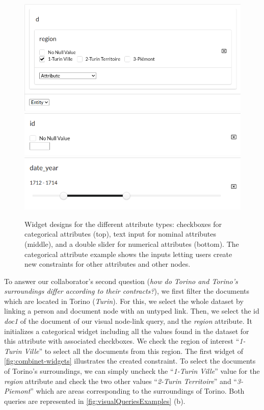 \begin{figure}[!ht]
    \centering
    \includegraphics[width=0.7\linewidth]{static/figures/ComBiNet/OriginalPaperFigures/constraintRegion.png}\\
    \includegraphics[width=0.6\linewidth]{static/figures/ComBiNet/OriginalPaperFigures/nominalWidget}\\
    \includegraphics[width=0.6\linewidth]{static/figures/ComBiNet/OriginalPaperFigures/numericWidget}

    \caption{Widget designs for the different attribute types: checkboxes for categorical attributes (top), text input for nominal attributes (middle), and a double slider for numerical attributes (bottom). The categorical attribute example shows the  inputs letting users create new constraints for other attributes and other nodes.}\label{fig:combinet-widgets}
\end{figure}

To answer our collaborator's second question (\textit{how do Torino and Torino's surroundings differ according to their contracts?}), we first filter the documents which are located in Torino (\textit{Turin}).
For this, we select the whole dataset by linking a person and document node with an untyped link.
Then, we select the id \textit{doc1} of the document of our visual node-link query, and the \textit{region} attribute.
It initializes a categorical widget including all the values found in the dataset for this attribute with associated checkboxes.
We check the region of interest ``\textit{1-Turin Ville}'' to select all the documents from this region.
 The first widget of \autoref{fig:combinet-widgets} illustrates the created constraint.
To select the documents of Torino's surroundings, we can simply uncheck the ``\textit{1-Turin Ville}'' value for the \textit{region} attribute and check the two other values ``\textit{2-Turin Territoire}'' and ``\textit{3-Piemont}'' which are areas corresponding to the surroundings of Torino.
Both queries are represented in \autoref{fig:visualQueriesExamples} (b).


